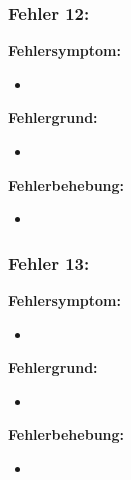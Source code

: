 \subsubsection{Fehler 12:}%
\textbf{Fehlersymptom:}
	\begin{itemize}
		\item 
	\end{itemize}
\textbf{Fehlergrund:}
	\begin{itemize}
		\item 
	\end{itemize}
\textbf{Fehlerbehebung:}
	\begin{itemize}
		\item 
	\end{itemize}
	
\subsubsection{Fehler 13:}%
\textbf{Fehlersymptom:}
	\begin{itemize}
		\item 
	\end{itemize}
\textbf{Fehlergrund:}
	\begin{itemize}
		\item 
	\end{itemize}
\textbf{Fehlerbehebung:}
	\begin{itemize}
		\item 
	\end{itemize}
